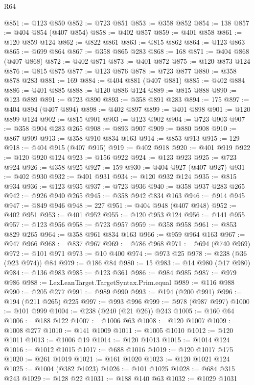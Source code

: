 \begin{lexlean}{R64}
\begin{coremodule}
@851 := @123 @850
@852 := @723 @851
@853 := @358 @852
@854 := 138
@857 := @404 @854 (@407 @854)
@858 := @402 @857
@859 := @401 @858
@861 := @120 @859 @124
@862 := @822 @861
@863 := @815 @862
@864 := @123 @863
@865 := @699 @864
@867 := @358 @865 @283
@868 := 168
@871 := @404 @868 (@407 @868)
@872 := @402 @871
@873 := @401 @872
@875 := @120 @873 @124
@876 := @815 @875
@877 := @123 @876
@878 := @723 @877
@880 := @358 @878 @283
@881 := 169
@884 := @404 @881 (@407 @881)
@885 := @402 @884
@886 := @401 @885
@888 := @120 @886 @124
@889 := @815 @888
@890 := @123 @889
@891 := @723 @890
@893 := @358 @891 @283
@894 := 175
@897 := @404 @894 (@407 @894)
@898 := @402 @897
@899 := @401 @898
@901 := @120 @899 @124
@902 := @815 @901
@903 := @123 @902
@904 := @723 @903
@907 := @358 @904 @283 @265
@908 := @893 @907
@909 := @880 @908
@910 := @867 @909
@913 := @358 @910 @834 @163
@914 := @853 @913
@915 := 129
@918 := @404 @915 (@407 @915)
@919 := @402 @918
@920 := @401 @919
@922 := @120 @920 @124
@923 := @156 @922
@924 := @123 @923
@925 := @723 @924
@926 := @358 @925
@927 := 159
@930 := @404 @927 (@407 @927)
@931 := @402 @930
@932 := @401 @931
@934 := @120 @932 @124
@935 := @815 @934
@936 := @123 @935
@937 := @723 @936
@940 := @358 @937 @283 @265
@942 := @926 @940 @265
@945 := @358 @942 @834 @163
@946 := @914 @945
@947 := @849 @946
@948 := 227
@951 := @404 @948 (@407 @948)
@952 := @402 @951
@953 := @401 @952
@955 := @120 @953 @124
@956 := @141 @955
@957 := @123 @956
@958 := @723 @957
@959 := @358 @958
@961 := @853 @829 @265
@964 := @358 @961 @834 @163
@966 := @959 @964 @163
@967 := @947 @966
@968 := @837 @967
@969 := @786 @968
@971 := @694 (@740 @969)
@972 := @101 @971
@973 := @10 @400
@974 := @973 @25
@978 := @238 (@36 (@23 @974)) @84
@979 := @186 @84
@980 := 15
@983 := @14 @980 (@17 @980)
@984 := @136 @983
@985 := @123 @361
@986 := @984 @985
@987 := @979 @986
@988 := LexLeanTarget.TargetSyntax.Prim.equal
@989 := @116 @988
@990 := @205 @277
@991 := @989 @990
@993 := @194 (@200 @991)
@996 := @194 (@211 @265) @225
@997 := @993 @996
@999 := @978 (@987 @997)
@1000 := @101 @999
@1004 := @238 (@240 (@21 @26)) @243
@1005 := @160 @64
@1006 := @188 @122
@1007 := @1006 @63
@1008 := @120 @1007
@1009 := @1008 @277
@1010 := @141 @1009
@1011 := @1005 @1010
@1012 := @120 @1011
@1013 := @1006 @19
@1014 := @120 @1013
@1015 := @1014 @124
@1016 := @1012 @1015
@1017 := @688 @1016
@1019 := @120 @1017 @175
@1020 := @261 @1019
@1021 := @161 @1020
@1023 := @120 @1021 @124
@1025 := @1004 (@382 @1023)
@1026 := @101 @1025
@1028 := @684 @315 @243
@1029 := @128 @22
@1031 := @188 @140 @63
@1032 := @1029 @1031

\end{coremodule}
\end{lexlean}

